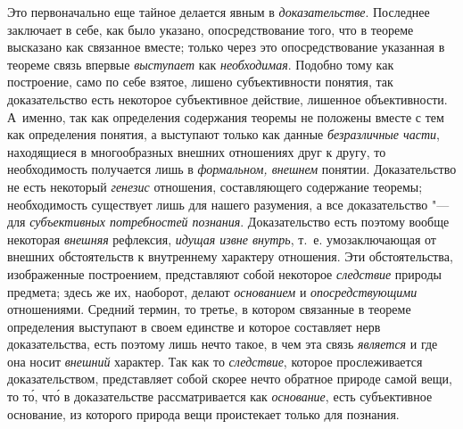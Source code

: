 {{Это первоначально еще тайное делается явным в
{\em доказательстве}.
Последнее заключает в себе, как было указано,
опосредствование того, что в теореме высказано как связанное вместе; только
через это опосредствование указанная в теореме связь впервые
{\em выступает} как
{\em необходимая}.
Подобно тому как построение, само по себе взятое, лишено
субъективности понятия, так доказательство есть некоторое субъективное
действие, лишенное объективности. А~именно, так как определения содержания
теоремы не положены вместе с тем как определения понятия, а выступают
только как данные {\em безразличные
части}, находящиеся в многообразных внешних отношениях друг
к другу, то необходимость получается лишь в
{\em формальном, внешнем}
понятии. Доказательство не есть некоторый
{\em генезис} отношения,
составляющего содержание теоремы; необходимость существует лишь для нашего
разумения, а все доказательство "--- для
{\em субъективных потребностей
познания}. Доказательство есть поэтому вообще некоторая
{\em внешняя} рефлексия,
{\em идущая извне внутрь},
т.~е. умозаключающая от внешних обстоятельств к внутреннему
характеру отношения. Эти обстоятельства, изображенные построением,
представляют собой некоторое
{\em следствие} природы
предмета; здесь же их, наоборот, делают
{\em основанием} и
{\em опосредствующими}
отношениями. Средний термин, то третье, в котором связанные в
теореме определения выступают в своем единстве и которое составляет нерв
доказательства, есть поэтому лишь нечто такое, в чем эта связь
{\em является} и где она
носит {\em внешний}
характер. Так как то
{\em следствие}, которое
прослеживается доказательством, представляет собой скорее нечто обратное
природе самой вещи, то т\'{о}, чт\'{о} в доказательстве рассматривается как
{\em основание}, есть
субъективное основание, из которого природа вещи проистекает только для
познания.

}}
